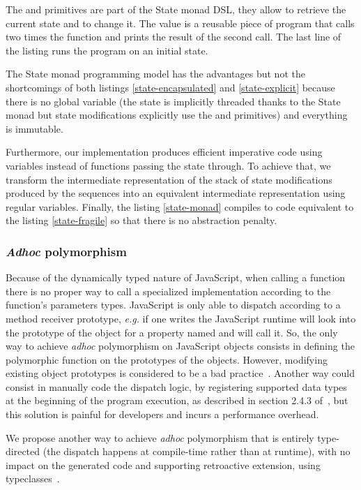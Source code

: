 \documentclass[american,english,runningheads]{llncs}
\newcommand{\eg}{\emph{e.g.}}
\begin{document}
The  and  primitives are part of the State monad DSL, they allow to retrieve the current state and to change it. The  value is a reusable piece of program that calls two times the  function and prints the result of the second call. The last line of the listing runs the  program on an initial state.

The State monad programming model has the advantages but not the shortcomings of both listings \ref{state-encapsulated} and \ref{state-explicit} because there is no global variable (the state is implicitly threaded thanks to the State monad but state modifications explicitly use the  and  primitives) and everything is immutable.

Furthermore, our implementation produces efficient imperative code using variables instead of functions passing the state through. To achieve that, we transform the intermediate representation of the stack of state modifications produced by the  sequences into an equivalent intermediate representation using regular variables. Finally, the listing \ref{state-monad} compiles to code equivalent to the listing \ref{state-fragile} so that there is no abstraction penalty.

\subsubsection{\emph{Adhoc} polymorphism}

Because of the dynamically typed nature of JavaScript, when calling a function there is no proper way to call a specialized implementation according to the function’s parameters types. JavaScript is only able to dispatch according to a method receiver prototype, \eg{} if one writes  the JavaScript runtime will look into the prototype of the  object for a property named  and will call it. So, the only way to achieve \emph{adhoc} polymorphism on JavaScript objects consists in defining the polymorphic function on the prototypes of the objects. However, modifying existing object prototypes is considered to be a bad practice~\cite{Zakas12_MaintainableJs}. Another way could consist in manually code the dispatch logic, by registering supported data types at the beginning of the program execution, as described in section 2.4.3 of~\cite{Abelson83_SICP}, but this solution is painful for developers and incurs a performance overhead.

We propose another way to achieve \emph{adhoc} polymorphism that is entirely type-directed (the dispatch happens at compile-time rather than at runtime), with no impact on the generated code and supporting retroactive extension, using typeclasses~\cite{Wadler89_AdhocPolymorphism,Odersky06_Typeclasses,Oliveira10_Typeclasses}.
\end{document}
